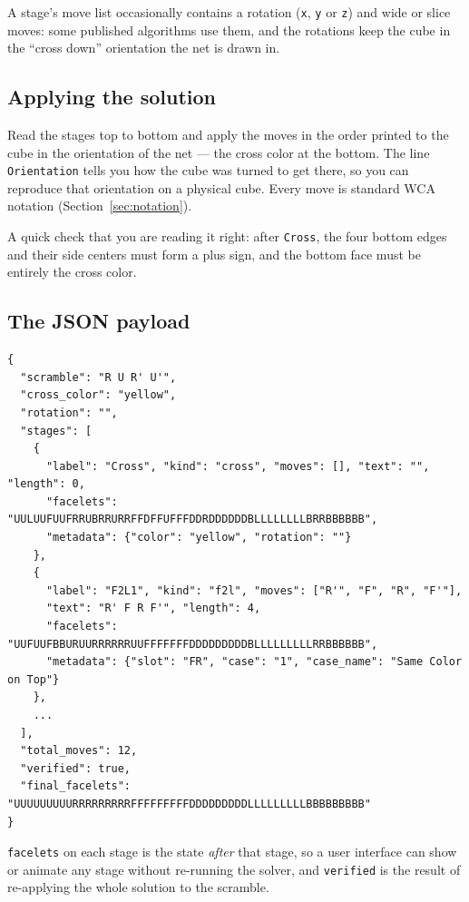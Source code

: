 A stage's move list occasionally contains a rotation (\texttt{x}, \texttt{y} or
\texttt{z}) and wide or slice moves: some published algorithms use them, and the
rotations keep the cube in the ``cross down'' orientation the net is drawn in.

\subsection{Applying the solution}

Read the stages top to bottom and apply the moves in the order printed to the cube
in the orientation of the net --- the cross color at the bottom.  The line
\texttt{Orientation} tells you how the cube was turned to get there, so you can
reproduce that orientation on a physical cube.  Every move is standard WCA notation
(Section~\ref{sec:notation}).

A quick check that you are reading it right: after \texttt{Cross}, the four bottom
edges and their side centers must form a plus sign, and the bottom face must be
entirely the cross color.

\subsection{The JSON payload}

\begin{lstlisting}[style=data]
{
  "scramble": "R U R' U'",
  "cross_color": "yellow",
  "rotation": "",
  "stages": [
    {
      "label": "Cross", "kind": "cross", "moves": [], "text": "", "length": 0,
      "facelets": "UULUUFUUFRRUBRRURRFFDFFUFFFDDRDDDDDDBLLLLLLLLBRRBBBBBB",
      "metadata": {"color": "yellow", "rotation": ""}
    },
    {
      "label": "F2L1", "kind": "f2l", "moves": ["R'", "F", "R", "F'"],
      "text": "R' F R F'", "length": 4,
      "facelets": "UUFUUFBBURUURRRRRRUUFFFFFFFDDDDDDDDDBLLLLLLLLLRRBBBBBB",
      "metadata": {"slot": "FR", "case": "1", "case_name": "Same Color on Top"}
    },
    ...
  ],
  "total_moves": 12,
  "verified": true,
  "final_facelets": "UUUUUUUUURRRRRRRRRFFFFFFFFFDDDDDDDDDLLLLLLLLLBBBBBBBBB"
}
\end{lstlisting}

\texttt{facelets} on each stage is the state \emph{after} that stage, so a user
interface can show or animate any stage without re-running the solver, and
\texttt{verified} is the result of re-applying the whole solution to the scramble.
